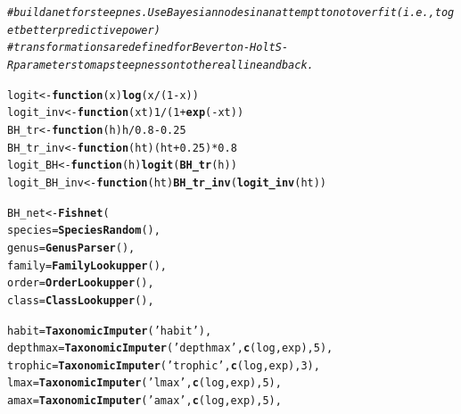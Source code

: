 \documentclass{dragonfly-report}\usepackage[]{graphicx}\usepackage[]{color}
\makeatletter
\newcommand{\hlnum}[1]{\textcolor[rgb]{0.686,0.059,0.569}{#1}}%
\newcommand{\hlstr}[1]{\textcolor[rgb]{0.192,0.494,0.8}{#1}}%
\newcommand{\hlcom}[1]{\textcolor[rgb]{0.678,0.584,0.686}{\textit{#1}}}%
\newcommand{\hlopt}[1]{\textcolor[rgb]{0,0,0}{#1}}%
\newcommand{\hlstd}[1]{\textcolor[rgb]{0.345,0.345,0.345}{#1}}%
\newcommand{\hlkwa}[1]{\textcolor[rgb]{0.161,0.373,0.58}{\textbf{#1}}}%
\newcommand{\hlkwb}[1]{\textcolor[rgb]{0.69,0.353,0.396}{#1}}%
\newcommand{\hlkwc}[1]{\textcolor[rgb]{0.333,0.667,0.333}{#1}}%
\newcommand{\hlkwd}[1]{\textcolor[rgb]{0.737,0.353,0.396}{\textbf{#1}}}%
\newenvironment{kframe}{%
 \def\at@end@of@kframe{}%
 \ifinner\ifhmode%
  \def\at@end@of@kframe{\end{minipage}}%
  \begin{minipage}{\columnwidth}%
 \fi\fi%
 \def\FrameCommand##1{\hskip\@totalleftmargin \hskip-\fboxsep
 \colorbox{shadecolor}{##1}\hskip-\fboxsep
     \hskip-\linewidth \hskip-\@totalleftmargin \hskip\columnwidth}%
 \MakeFramed {\advance\hsize-\width
   \@totalleftmargin\z@ \linewidth\hsize
   \@setminipage}}%
 {\par\unskip\endMakeFramed%
 \at@end@of@kframe}
\newenvironment{knitrout}{}{} %
\makeatother
\begin{document}
\begin{knitrout}
\color{fgcolor}\begin{kframe}
\begin{alltt}
\hlcom{# build a net for steepnes. Use Bayesian nodes in an attempt to not overfit (i.e., to get better predictive power)}
\hlcom{# transformations are defined for Beverton-Holt S-R parameters to map steepness onto the real line and back.}

\hlstd{logit} \hlkwb{<-} \hlkwa{function}\hlstd{(}\hlkwc{x}\hlstd{)} \hlkwd{log}\hlstd{(x}\hlopt{/}\hlstd{(}\hlnum{1}\hlopt{-}\hlstd{x))}
\hlstd{logit_inv} \hlkwb{<-} \hlkwa{function}\hlstd{(}\hlkwc{xt}\hlstd{)} \hlnum{1}\hlopt{/}\hlstd{(}\hlnum{1} \hlopt{+} \hlkwd{exp}\hlstd{(}\hlopt{-}\hlstd{xt))}
\hlstd{BH_tr} \hlkwb{<-} \hlkwa{function}\hlstd{(}\hlkwc{h}\hlstd{) h}\hlopt{/}\hlnum{0.8}\hlopt{-}\hlnum{0.25}
\hlstd{BH_tr_inv} \hlkwb{<-} \hlkwa{function}\hlstd{(}\hlkwc{ht}\hlstd{) (ht}\hlopt{+}\hlnum{0.25}\hlstd{)}\hlopt{*}\hlnum{0.8}
\hlstd{logit_BH} \hlkwb{<-} \hlkwa{function}\hlstd{(}\hlkwc{h}\hlstd{)} \hlkwd{logit}\hlstd{(}\hlkwd{BH_tr}\hlstd{(h))}
\hlstd{logit_BH_inv} \hlkwb{<-} \hlkwa{function}\hlstd{(}\hlkwc{ht}\hlstd{)} \hlkwd{BH_tr_inv}\hlstd{(}\hlkwd{logit_inv}\hlstd{(ht))}

\hlstd{BH_net} \hlkwb{<-} \hlkwd{Fishnet}\hlstd{(}
  \hlkwc{species}   \hlstd{=} \hlkwd{SpeciesRandom}\hlstd{(),}
  \hlkwc{genus}     \hlstd{=} \hlkwd{GenusParser}\hlstd{(),}
  \hlkwc{family}    \hlstd{=} \hlkwd{FamilyLookupper}\hlstd{(),}
  \hlkwc{order}     \hlstd{=} \hlkwd{OrderLookupper}\hlstd{(),}
  \hlkwc{class}     \hlstd{=} \hlkwd{ClassLookupper}\hlstd{(),}

  \hlkwc{habit}     \hlstd{=} \hlkwd{TaxonomicImputer}\hlstd{(}\hlstr{'habit'}\hlstd{),}
  \hlkwc{depthmax}  \hlstd{=} \hlkwd{TaxonomicImputer}\hlstd{(}\hlstr{'depthmax'}\hlstd{,}\hlkwd{c}\hlstd{(log,exp),}\hlnum{5}\hlstd{),}
  \hlkwc{trophic}   \hlstd{=} \hlkwd{TaxonomicImputer}\hlstd{(}\hlstr{'trophic'}\hlstd{,}\hlkwd{c}\hlstd{(log,exp),}\hlnum{3}\hlstd{),}
  \hlkwc{lmax}      \hlstd{=} \hlkwd{TaxonomicImputer}\hlstd{(}\hlstr{'lmax'}\hlstd{,}\hlkwd{c}\hlstd{(log,exp),}\hlnum{5}\hlstd{),}
  \hlkwc{amax}      \hlstd{=} \hlkwd{TaxonomicImputer}\hlstd{(}\hlstr{'amax'}\hlstd{,}\hlkwd{c}\hlstd{(log,exp),}\hlnum{5}\hlstd{),}


\end{alltt}
\end{kframe}
\end{knitrout}
\end{document}
